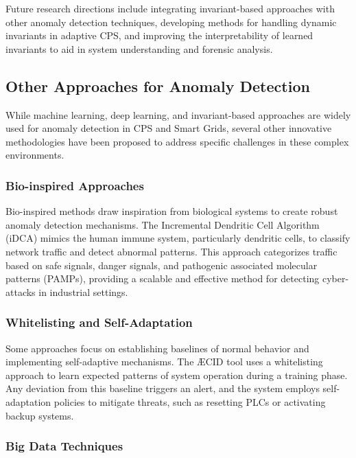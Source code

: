 Future research directions include integrating invariant-based approaches with other anomaly detection techniques, developing methods for handling dynamic invariants in adaptive CPS, and improving the interpretability of learned invariants to aid in system understanding and forensic analysis.






\subsection{Other Approaches for Anomaly Detection}

While machine learning, deep learning, and invariant-based approaches are widely used for anomaly detection in CPS and Smart Grids, several other innovative methodologies have been proposed to address specific challenges in these complex environments.

\subsubsection{Bio-inspired Approaches}

Bio-inspired methods draw inspiration from biological systems to create robust anomaly detection mechanisms. The Incremental Dendritic Cell Algorithm (iDCA) \cite{64} mimics the human immune system, particularly dendritic cells, to classify network traffic and detect abnormal patterns. This approach categorizes traffic based on safe signals, danger signals, and pathogenic associated molecular patterns (PAMPs), providing a scalable and effective method for detecting cyber-attacks in industrial settings.

\subsubsection{Whitelisting and Self-Adaptation}

Some approaches focus on establishing baselines of normal behavior and implementing self-adaptive mechanisms. The \AE CID tool \cite{55} uses a whitelisting approach to learn expected patterns of system operation during a training phase. Any deviation from this baseline triggers an alert, and the system employs self-adaptation policies to mitigate threats, such as resetting PLCs or activating backup systems.


\subsubsection{Big Data Techniques}

